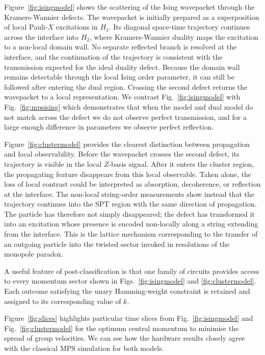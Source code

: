 \documentclass[aps,floatfix,10pt,amssymb,amsfont,amsmath,superscriptaddress,float,nofootinbib,longbibliography,nobalancelastpage,twocolumn]{revtex4-2}
\begin{document}
Figure~\ref{fig:isingmodel} shows the scattering of the Ising wavepacket through the Kramers-Wannier defects. The wavepacket is initially prepared as a superposition of local Pauli-$X$ excitations in $H_1$. Its diagonal space-time trajectory continues across the interface into $H_2$, where Kramers-Wannier duality maps the excitation to a non-local domain wall. No separate reflected branch is resolved at the interface, and the continuation of the trajectory is consistent with the transmission expected for the ideal duality defect. Because the domain wall remains detectable through the local Ising order parameter, it can still be followed after entering the dual region. Crossing the second defect returns the wavepacket to a local representation. We contrast Fig.~\ref{fig:isingmodel} with Fig.~\ref{fig:mpsising} which demonstrates that when the model and dual model do not match across the defect we do not observe perfect transmission, and for a large enough difference in parameters we observe perfect reflection.

Figure~\ref{fig:clustermodel} provides the clearest distinction between propagation and local observability. Before the wavepacket crosses the second defect, its trajectory is visible in the local $Z$-basis signal. After it enters the cluster region, the propagating feature disappears from this local observable. Taken alone, the loss of local contrast could be interpreted as absorption, decoherence, or reflection at the interface. The non-local string-order measurements show instead that the trajectory continues into the SPT region with the same direction of propagation. The particle has therefore not simply disappeared; the defect has transformed it into an excitation whose presence is encoded non-locally along a string extending from the interface. This is the lattice mechanism corresponding to the transfer of an outgoing particle into the twisted sector invoked in resolutions of the monopole paradox.

A useful feature of post-classification is that one family of circuits provides access to every momentum sector shown in Figs.~\ref{fig:isingmodel} and \ref{fig:clustermodel}. Each outcome satisfying the unary Hamming-weight constraint is retained and assigned to its corresponding value of $k$. 

Figure~\ref{fig:slices} highlights particular time slices from Fig.~\ref{fig:isingmodel} and Fig.~\ref{fig:clustermodel} for the optimum central momentum to minimise the spread of group velocities. We can see how the hardware results closely agree with the classical MPS simulation for both models.
\end{document}
